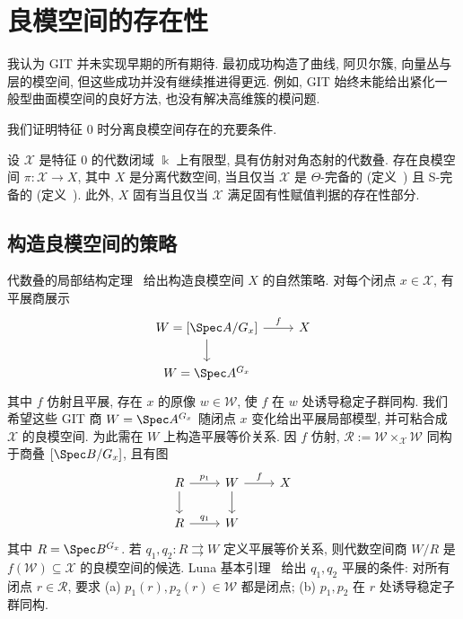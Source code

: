 \section{良模空间的存在性}\label{src:7.10}
\begin{epigraph}
我认为 GIT 并未实现早期的所有期待. 最初成功构造了曲线, 阿贝尔簇, 向量丛与层的模空间, 但这些成功并没有继续推进得更远. 例如, GIT 始终未能给出紧化一般型曲面模空间的良好方法, 也没有解决高维簇的模问题.
\end{epigraph}
我们证明特征 $0$ 时分离良模空间存在的充要条件.
\begin{theorem}[良模空间存在性定理]\label{src:7.10.1}
设 $\mathcal X$ 是特征 $0$ 的代数闭域 $\Bbbk$ 上有限型, 具有仿射对角态射的代数叠. 存在良模空间 $\pi:\mathcal X\to X$, 其中 $X$ 是分离代数空间, 当且仅当 $\mathcal X$ 是 $\Theta$-完备的 (定义~) 且 S-完备的 (定义~). 此外, $X$ 固有当且仅当 $\mathcal X$ 满足固有性赋值判据的存在性部分.
\end{theorem}
\subsection{构造良模空间的策略}\label{src:7.10.1-subsection}
代数叠的局部结构定理~ 给出构造良模空间 $X$ 的自然策略. 对每个闭点 $x\in\mathcal X$, 有平展商展示
\[\begin{tikzcd}[ampersand replacement=\&]\mathcal W={[\Spec A/G_x]}\arrow[r,"{f}"]\arrow[d]\&\mathcal X\\W=\Spec A^{G_x}\&\end{tikzcd}\]
其中 $f$ 仿射且平展, 存在 $x$ 的原像 $w\in\mathcal W$, 使 $f$ 在 $w$ 处诱导稳定子群同构. 我们希望这些 GIT 商 $W=\Spec A^{G_x}$ 随闭点 $x$ 变化给出平展局部模型, 并可粘合成 $\mathcal X$ 的良模空间. 为此需在 $W$ 上构造平展等价关系. 因 $f$ 仿射, $\mathcal R:=\mathcal W\times_{\mathcal X}\mathcal W$ 同构于商叠 $[\Spec B/G_x]$, 且有图
\[\begin{tikzcd}[ampersand replacement=\&]\mathcal R\arrow[r,"{p_1}"]\arrow[d]\&\mathcal W\arrow[r,"{f}"]\arrow[d]\&\mathcal X\\R\arrow[r,"{q_1}"]\&W\&\end{tikzcd}\]
其中 $R=\Spec B^{G_x}$. 若 $q_1,q_2:R\rightrightarrows W$ 定义平展等价关系, 则代数空间商 $W/R$ 是 $f(\mathcal W)\subseteq\mathcal X$ 的良模空间的候选. Luna 基本引理~ 给出 $q_1,q_2$ 平展的条件: 对所有闭点 $r\in\mathcal R$, 要求 (a) $p_1(r),p_2(r)\in\mathcal W$ 都是闭点; (b) $p_1,p_2$ 在 $r$ 处诱导稳定子群同构.

